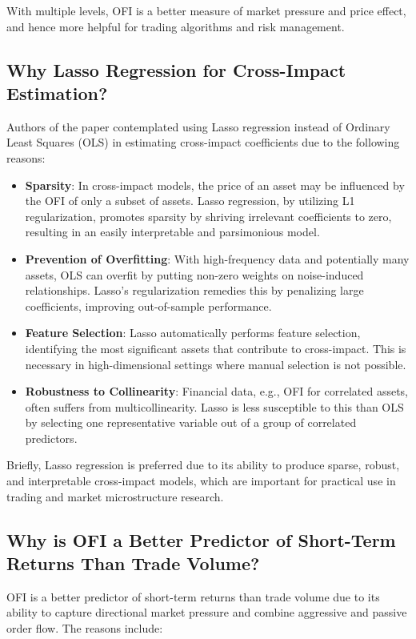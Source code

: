 \documentclass[12pt]{article}
\begin{document}
With multiple levels, OFI is a better measure of market pressure and price effect, and hence more helpful for trading algorithms and risk management.

\subsection{Why Lasso Regression for Cross-Impact Estimation?}
Authors of the paper contemplated using Lasso regression instead of Ordinary Least Squares (OLS) in estimating cross-impact coefficients due to the following reasons:

\begin{itemize}
    \item \textbf{Sparsity}: In cross-impact models, the price of an asset may be influenced by the OFI of only a subset of assets. Lasso regression, by utilizing L1 regularization, promotes sparsity by shriving irrelevant coefficients to zero, resulting in an easily interpretable and parsimonious model.
    \item \textbf{Prevention of Overfitting}: With high-frequency data and potentially many assets, OLS can overfit by putting non-zero weights on noise-induced relationships. Lasso's regularization remedies this by penalizing large coefficients, improving out-of-sample performance.
    \item \textbf{Feature Selection}: Lasso automatically performs feature selection, identifying the most significant assets that contribute to cross-impact. This is necessary in high-dimensional settings where manual selection is not possible.
    \item \textbf{Robustness to Collinearity}: Financial data, e.g., OFI for correlated assets, often suffers from multicollinearity. Lasso is less susceptible to this than OLS by selecting one representative variable out of a group of correlated predictors.
\end{itemize}

Briefly, Lasso regression is preferred due to its ability to produce sparse, robust, and interpretable cross-impact models, which are important for practical use in trading and market microstructure research.

\subsection{Why is OFI a Better Predictor of Short-Term Returns Than Trade Volume?}
OFI is a better predictor of short-term returns than trade volume due to its ability to capture directional market pressure and combine aggressive and passive order flow. The reasons include:
\end{document}
